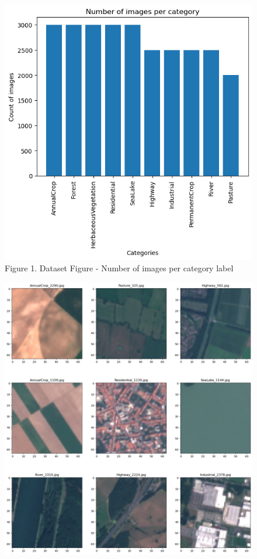 \documentclass[acmtog]{acmart}
\begin{document}
	\begin{minipage}{\textwidth}
		\begin{subfigure}[h]{0.5\linewidth}
			\centering
			\includegraphics[scale=0.6]{Fig1.png} \\
			Figure 1. Dataset Figure - Number of images per category label
		\end{subfigure}
		\begin{subfigure}[h]{0.5\linewidth}
			\centering
			\includegraphics[scale=0.3]{Fig2.png} \\

\end{subfigure}
\end{minipage}
\end{document}
